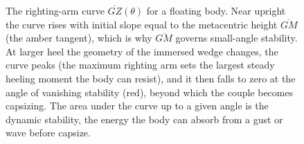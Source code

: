 \begin{figure}[htbp]
\centering
{}
\caption[The righting-arm curve]{The righting-arm curve
$\overline{GZ}(\theta)$ for a floating body. Near upright the curve rises
with initial slope equal to the metacentric height $\overline{GM}$ (the
amber tangent), which is why $\overline{GM}$ governs small-angle stability.
At larger heel the geometry of the immersed wedge changes, the curve peaks
(the maximum righting arm sets the largest steady heeling moment the body
can resist), and it then falls to zero at the angle of vanishing stability
(red), beyond which the couple becomes capsizing. The area under the curve
up to a given angle is the dynamic stability, the energy the body can
absorb from a gust or wave before capsize.}
\label{fig:vol03ch10:righting-arm}
\end{figure}
